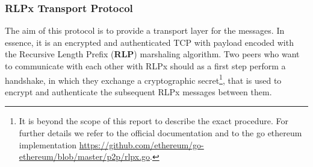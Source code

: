 \subsubsection{RLPx Transport Protocol}
\label{sec:rlpx-transport-protocol}

The aim of this protocol is to provide a transport layer for the messages. In
essence, it is an encrypted and authenticated TCP with payload encoded with the
Recursive Length Prefix (\textbf{RLP}) marshaling algorithm. Two peers who want
to communicate with each other with RLPx should as a first step perform a
handshake, in which they exchange a cryptographic secret\footnote{It is beyond
the scope of this report to describe the exact procedure. For further details we
refer to the official documentation \cite{rlpx} and to the go ethereum
implementation
\url{https://github.com/ethereum/go-ethereum/blob/master/p2p/rlpx.go}.},
that is used to encrypt and authenticate the subsequent RLPx messages between
them.
